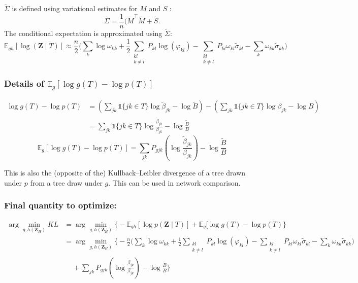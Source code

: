 \documentclass[11pt,a4paper]{article}
\newcommand{\argmin}{\arg\!\min}
\newcommand{\Zbf}{\boldsymbol{Z}}
\newcommand{\Esp}{\mathds{E}}
\begin{document}
$\widetilde{\Sigma}$ is defined using variational estimates for $M$ and $S$ : $$\widetilde{\Sigma} = \frac{1}{n}(\widetilde{M}^\intercal \widetilde{M} + \widetilde{S}. $$
The conditional expectation is approximated using $\widetilde{\Sigma}$:
$$\Esp_{gh} [\log(\Zbf \mid T)] \approx \frac{n}{2} \Big( \sum_{k} \log \omega_{kk}+\frac{1}{2}\sum _{\substack{kl\\ k \neq l}} P_{kl} \log (\varphi_{kl}) - \sum_{\substack{kl\\ k \neq l}} P_{kl} \omega_{kl} \widetilde{\sigma}_{kl} - \sum_{k} \omega_{kk} \widetilde{\sigma}_{kk}\Big)$$
\subsubsection{Details of $\Esp_g[\log g(T) - \log p(T)]$}
\begin{align*}
\log g(T) - \log p(T) &= \left(  \sum_{jk} \mathds{1}\{jk \in T\} \log \widetilde{\beta}_{jk} - \log \widetilde{B}\right) - \left(  \sum_{jk} \mathds{1}\{jk \in T\} \log {\beta}_{jk} - \log {B}\right)\\
&=\sum_{jk} \mathds{1}\{jk \in T\} \log \frac{\widetilde{\beta}_{jk}}{{\beta}_{jk}} - \log \frac{\widetilde{B}}{B}
\end{align*}
$$\boxed{
\Esp_g[\log g(T) - \log p(T)] = \sum_{jk}P_{gjk} \left(\log \frac{\widetilde{\beta}_{jk}}{{\beta}_{jk}}\right) - \log \frac{\widetilde{B}}{B} }$$

 
This is also the (opposite of the) Kullback–Leibler divergence of a tree drawn under $p$ from a tree draw under $g$. This can be used in network comparison.
 
\subsubsection{Final quantity to optimize:}
\begin{align*}
\argmin_{g,h(\Zbf_H)} KL  &=\argmin_{g,h(\Zbf_H)}  \Big\{-\Esp_{gh}[\log p(\Zbf \mid T) ] + \Esp_g[\log g(T) - \log p(T)\Big\}\\
&= \argmin_{g,h(\Zbf_H)}  \bigg\{ -\frac{n}{2} \Big( \sum_{k} \log \omega_{kk}+\frac{1}{2}\sum _{\substack{kl\\ k \neq l}} P_{kl} \log (\varphi_{kl}) - \sum_{\substack{kl\\ k \neq l}} P_{kl} \omega_{kl} \widetilde{\sigma}_{kl} - \sum_{k} \omega_{kk} \widetilde{\sigma}_{kk}\Big) \\
& \;\;\;\; + \sum_{jk}P_{gjk} \left(\log \frac{\widetilde{\beta}_{jk}}{{\beta}_{jk}}\right) - \log \frac{\widetilde{B}}{B} \bigg\}
\end{align*}
 
\end{document}
